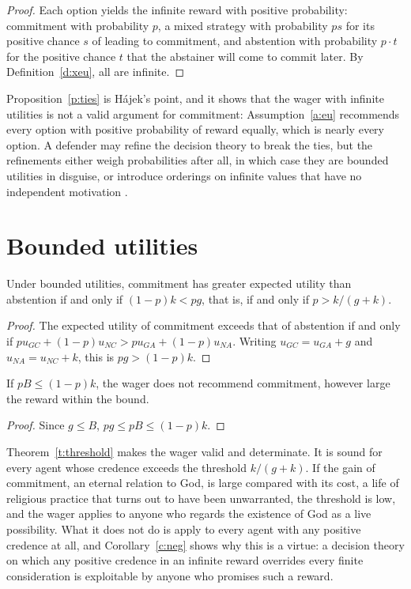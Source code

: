 \documentclass{situationist-preprint}
\begin{document}
\begin{proof}
Each option yields the infinite reward with positive probability: commitment with probability $p$, a mixed strategy with probability $ps$ for its positive chance $s$ of leading to commitment, and abstention with probability $p\cdot t$ for the positive chance $t$ that the abstainer will come to commit later. By Definition~\ref{d:xeu}, all are infinite.
\end{proof}

Proposition~\ref{p:ties} is Hájek's point, and it shows that the wager with infinite utilities is not a valid argument for commitment: Assumption~\ref{a:eu} recommends every option with positive probability of reward equally, which is nearly every option. A defender may refine the decision theory to break the ties, but the refinements either weigh probabilities after all, in which case they are bounded utilities in disguise, or introduce orderings on infinite values that have no independent motivation \citep{Hajek2003}.

\section{Bounded utilities}

\begin{theorem}[Threshold]\label{t:threshold}
Under bounded utilities, commitment has greater expected utility than abstention if and only if $(1 - p) k < p g$, that is, if and only if $p > k/(g + k)$.
\end{theorem}

\begin{proof}
The expected utility of commitment exceeds that of abstention if and only if $p u_{GC} + (1-p) u_{NC} > p u_{GA} + (1-p) u_{NA}$. Writing $u_{GC} = u_{GA} + g$ and $u_{NA} = u_{NC} + k$, this is $pg > (1-p)k$.
\end{proof}

\begin{corollary}\label{c:neg}
If $pB \leq (1-p)k$, the wager does not recommend commitment, however large the reward within the bound.
\end{corollary}

\begin{proof}
Since $g \leq B$, $pg \leq pB \leq (1-p)k$.
\end{proof}

Theorem~\ref{t:threshold} makes the wager valid and determinate. It is sound for every agent whose credence exceeds the threshold $k/(g+k)$. If the gain of commitment, an eternal relation to God, is large compared with its cost, a life of religious practice that turns out to have been unwarranted, the threshold is low, and the wager applies to anyone who regards the existence of God as a live possibility. What it does not do is apply to every agent with any positive credence at all, and Corollary~\ref{c:neg} shows why this is a virtue: a decision theory on which any positive credence in an infinite reward overrides every finite consideration is exploitable by anyone who promises such a reward.
\end{document}

